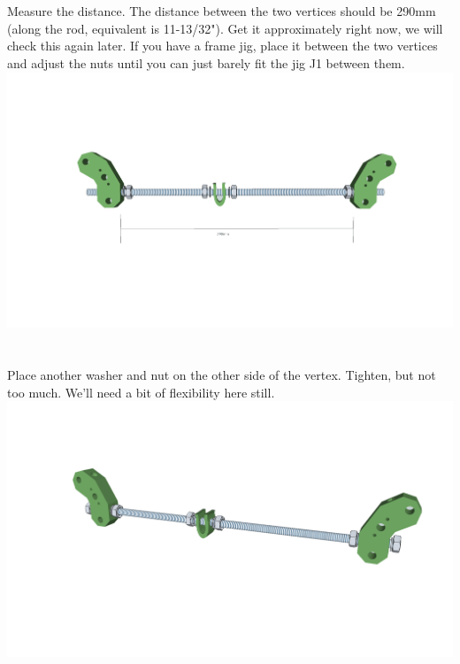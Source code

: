\documentclass[twoside,a4paper,titlepage]{memoir}
\begin{document}
	\section{}
	Measure the distance. The distance between the two vertices should be 290mm (along the rod,
	equivalent is 11-13/32"). Get it approximately right now, we will check this again later. If you have a
	frame jig, place it between the two vertices and adjust the nuts until you can just barely fit the jig J1
	between them. \\
	\includegraphics[width=1\linewidth]{graphics/ch1_7.png}
	
	\section{}
	Place another washer and nut on the other side of the vertex. Tighten, but not too much. We'll need a
	bit of flexibility here still. \\
	\includegraphics[width=1\linewidth]{graphics/ch1_8.png}
	
\end{document}
